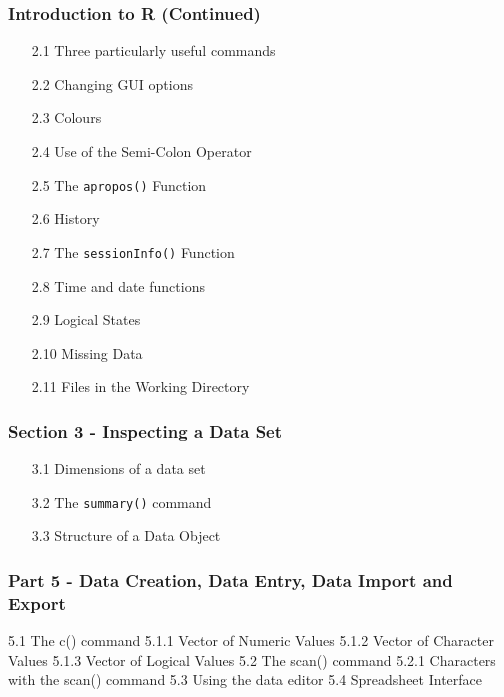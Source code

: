 \documentclass{beamer}
\begin{document}
 
 
 \frametitle{Introduction to R (Continued) }
 \begin{itemize}
 \item[2.1] Three particularly useful commands    
 \item[2.2] Changing GUI options     
 \item[2.3] Colours      
 \item[2.4] Use of the Semi-Colon Operator     
 \item[2.5] The \texttt{apropos()} Function     
 \item[2.6] History       
 \item[2.7] The \texttt{sessionInfo()} Function     
 \item[2.8] Time and date functions     
 \item[2.9] Logical States      
 \item[2.10] Missing Data      
 \item[2.11] Files in the Working Directory     
 \end{itemize}
 
 
 \frametitle{Section 3 - Inspecting a Data Set }
 \begin{itemize}
 \item[3.1] Dimensions of a data set 
 \item[3.2] The \texttt{summary()} command 
 \item[3.3] Structure of a Data Object 
 \end{itemize}
 
 
 
 \frametitle{Part 5 - Data Creation, Data Entry, Data Import and Export}
 \begin{framed}
 \begin{semiverbatim}
 5.1 The c() command 
 5.1.1 Vector of Numeric Values
 5.1.2 Vector of Character Values
 5.1.3 Vector of Logical Values 
 5.2 The scan() command 
 5.2.1 Characters with the scan() command
 5.3 Using the data editor
 5.4 Spreadsheet Interface 
 \end{semiverbatim}
 \end{framed}
 
\end{document}
